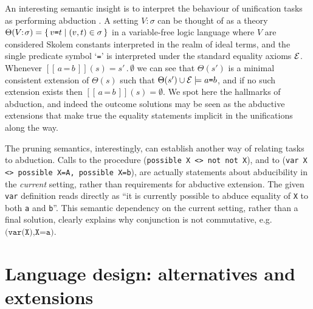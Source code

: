 \documentclass{tlp}
\def\set#1#2{\{\,#1\;|\;#2\,\}}
\def\denotstart{[\![\,}
\def\denotend{\,]\!]}
\def\denot#1{\denotstart#1\denotend}
\def\s{\sigma}
\def\obeq{\,\texttt{=}\,}
\def\stng#1#2{#1\!\!:\!#2}
\def\ff{\emptyset}
\def\soutsym{{\,.\,}}
\def\sout#1#2{#1\soutsym#2}
\begin{document}
An interesting semantic insight is to interpret the behaviour of unification
tasks as performing abduction \cite{ka_ko_to:93:alp}. A setting $\stng V\s$ can
be thought of as a theory $\Theta(\stng V\s)=\set{v\mbox{\tt =}t}{(v,t)\in\s}$ in
a variable-free logic language where $V$ are considered Skolem constants
interpreted in the realm of ideal terms, and the single predicate symbol `{\tt=}'
is interpreted under the standard equality axioms ${\cal E}$. Whenever $\denot{a\obeq
  b}(s)=\sout{s'\!}\ff$ we can see that $\Theta(s')$ is a minimal consistent
extension of $\Theta(s)$ such that $\Theta(s')\cup{\cal E}\models a\mbox{\tt=}b$, and
if no such extension exists then $\denot{a\obeq b}(s)=\ff$. We spot here the
hallmarks of abduction, and indeed the outcome solutions may be seen as the
abductive extensions that make true the equality statements implicit in the
unifications along the way.

The pruning semantics, interestingly, can establish
another way of relating tasks to abduction. Calls to the procedure
(\texttt{possible X <> not not X}), and to (\texttt{var X <> possible X=A,
  possible X=b}), are actually statements about abducibility in the
\emph{current} setting, rather than requirements for abductive extension. The
given \texttt{var} definition reads directly as ``it is currently possible to
abduce equality of \verb=X= to both \verb=a= and \verb=b=''. This semantic
dependency on the current setting, rather than a final solution, clearly explains
why conjunction is not commutative, e.g.\ $\texttt{(var(X),X=a)}$.

\section{Language design: alternatives and extensions}
\label{sec:alter}
\end{document}

